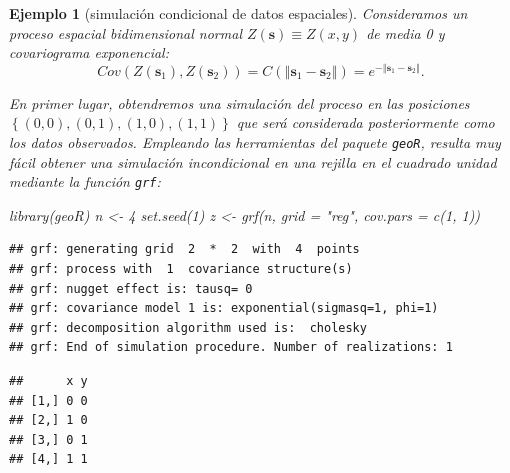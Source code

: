 \documentclass[
]{book}
\newenvironment{Shaded}{\begin{snugshade}}{\end{snugshade}}
\newcommand{\AttributeTok}[1]{\textcolor[rgb]{0.77,0.63,0.00}{#1}}
\newcommand{\CommentTok}[1]{\textcolor[rgb]{0.56,0.35,0.01}{\textit{#1}}}
\newcommand{\DecValTok}[1]{\textcolor[rgb]{0.00,0.00,0.81}{#1}}
\newcommand{\FunctionTok}[1]{\textcolor[rgb]{0.00,0.00,0.00}{#1}}
\newcommand{\NormalTok}[1]{#1}
\newcommand{\OtherTok}[1]{\textcolor[rgb]{0.56,0.35,0.01}{#1}}
\newcommand{\SpecialCharTok}[1]{\textcolor[rgb]{0.00,0.00,0.00}{#1}}
\newcommand{\StringTok}[1]{\textcolor[rgb]{0.31,0.60,0.02}{#1}}
\theoremstyle{break}
\newtheorem{example}{Ejemplo}[chapter]
\theoremstyle{nonumberplain}
\begin{document}
\begin{example}[simulación condicional de datos espaciales]

Consideramos un proceso espacial bidimensional normal
\(Z(\mathbf{s})\equiv Z(x,y)\) de media 0 y covariograma
exponencial:
\[Cov(Z(\mathbf{s}_1),Z(\mathbf{s}_2)) 
= C(\left\Vert \mathbf{s}_1-\mathbf{s}_2\right\Vert )
= e^{-\left\Vert \mathbf{s}_1-\mathbf{s}_2\right\Vert }.\]

En primer lugar, obtendremos una simulación del proceso en las posiciones
\(\left\{(0,0),(0,1),(1,0),(1,1)\right\}\) que será considerada posteriormente
como los datos observados.
Empleando las herramientas del paquete \texttt{geoR}, resulta muy fácil obtener
una simulación incondicional en una rejilla en el cuadrado unidad
mediante la función \texttt{grf}:

\begin{Shaded}
\begin{Highlighting}[]
\FunctionTok{library}\NormalTok{(geoR)}
\NormalTok{n }\OtherTok{\textless{}{-}} \DecValTok{4}
\FunctionTok{set.seed}\NormalTok{(}\DecValTok{1}\NormalTok{)}
\NormalTok{z }\OtherTok{\textless{}{-}} \FunctionTok{grf}\NormalTok{(n, }\AttributeTok{grid =} \StringTok{"reg"}\NormalTok{, }\AttributeTok{cov.pars =} \FunctionTok{c}\NormalTok{(}\DecValTok{1}\NormalTok{, }\DecValTok{1}\NormalTok{))}
\end{Highlighting}
\end{Shaded}

\begin{verbatim}
## grf: generating grid  2  *  2  with  4  points
## grf: process with  1  covariance structure(s)
## grf: nugget effect is: tausq= 0 
## grf: covariance model 1 is: exponential(sigmasq=1, phi=1)
## grf: decomposition algorithm used is:  cholesky 
## grf: End of simulation procedure. Number of realizations: 1
\end{verbatim}

\begin{Shaded}
\end{Shaded}

\begin{verbatim}
##      x y
## [1,] 0 0
## [2,] 1 0
## [3,] 0 1
## [4,] 1 1
\end{verbatim}

\begin{Shaded}
\end{Shaded}


\end{example}
\end{document}
